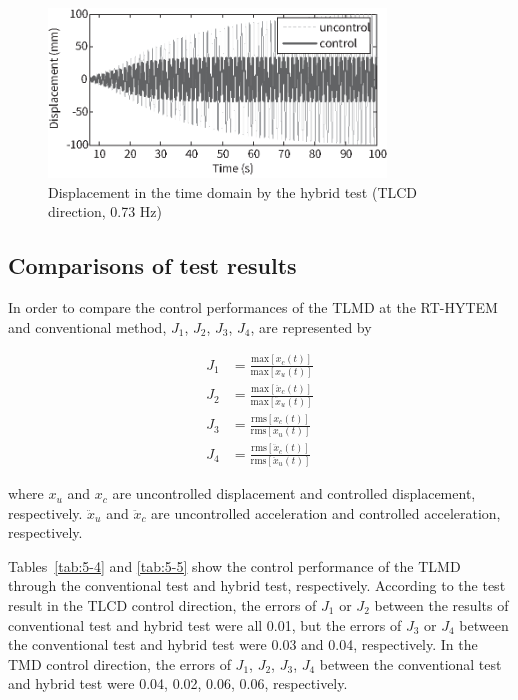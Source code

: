 \begin{figure}[ht]
\centering
\includegraphics[width=0.8\textwidth] {figure/5-24.eps}
\caption{Displacement in the time domain by the hybrid test (TLCD direction, 0.73 Hz)}
\label{fig:5-24}
\end{figure}

\subsection{Comparisons of test results}

In order to compare the control performances of the TLMD at the RT-HYTEM and conventional method, $J_{1}$, $J_{2}$, $J_{3}$, $J_{4}$, are represented by

\begin{align}
J_{1}&=\frac{\text{max} \left[x_{c}(t) \right]}{\text{max} \left[x_{u}(t) \right]} \label{eq:5-14} \\
J_{2}&=\frac{\text{max} \left[\ddot{x}_{c}(t) \right]}{\text{max} \left[\ddot{x}_{u}(t) \right]} \label{eq:5-15} \\
J_{3}&=\frac{\text{rms} \left[x_{c}(t) \right]}{\text{rms} \left[x_{u}(t) \right]} \label{eq:5-16} \\
J_{4}&=\frac{\text{rms} \left[\ddot{x}_{c}(t) \right]}{\text{rms} \left[\ddot{x}_{u}(t) \right]} \label{eq:5-17}
\end{align}

where $x_{u}$ and $x_{c}$ are uncontrolled displacement and controlled displacement, respectively. $\ddot{x}_{u}$ and $\ddot{x}_{c}$ are uncontrolled acceleration and controlled acceleration, respectively.

Tables~\ref{tab:5-4} and \ref{tab:5-5} show the control performance of the TLMD through the conventional test and hybrid test, respectively. According to the test result in the TLCD control direction, the errors of $J_{1}$ or $J_{2}$ between the results of conventional test and hybrid test were all 0.01, but the errors of $J_{3}$ or $J_{4}$ between the conventional test and hybrid test were 0.03 and 0.04, respectively. In the TMD control direction, the errors of $J_{1}$, $J_{2}$, $J_{3}$, $J_{4}$ between the conventional test and hybrid test were 0.04, 0.02, 0.06, 0.06, respectively.

